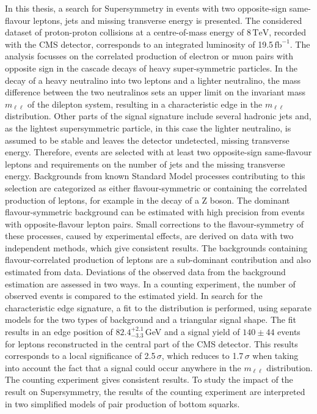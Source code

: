 In this thesis, a search for Supersymmetry in events with two opposite-sign same-flavour leptons, jets and missing transverse energy is presented. The considered dataset of proton-proton collisions at a centre-of-mass energy of 8$\,\mathrm{TeV}$, recorded with the CMS detector, corresponds to an integrated luminosity of 19.5\,$\mathrm{fb}^{-1}$. The analysis focusses on the correlated production of electron or muon pairs with opposite sign in the cascade decays of heavy super-symmetric particles. In the decay of a heavy neutralino into two leptons and a lighter neutralino, the mass difference between the two neutralinos sets an upper limit on the invariant mass $m_{\ell\ell}$ of the dilepton system, resulting in a characteristic edge in the $m_{\ell\ell}$ distribution. Other parts of the signal signature include several hadronic jets and, as the lightest supersymmetric particle, in this case the lighter neutralino, is assumed to be stable and leaves the detector undetected, missing transverse energy. Therefore, events are selected with at least two opposite-sign same-flavour leptons and requirements on the number of jets and the missing transverse energy. Backgrounds from known Standard Model processes contributing to this selection are categorized as either flavour-symmetric or containing the correlated production of leptons, for example in the decay of a $\mathrm{Z}$ boson. The dominant flavour-symmetric background can be estimated with high precision from events with opposite-flavour lepton pairs. Small corrections to the flavour-symmetry of these processes, caused by experimental effects, are derived on data with two independent methods, which give consistent results. The backgrounds containing flavour-correlated production of leptons are a sub-dominant contribution and also estimated from data. Deviations of the observed data from the background estimation are assessed in two ways. In a counting experiment, the number of observed events is compared to the estimated yield. In search for the characteristic edge signature, a fit to the \mll distribution is performed, using separate models for the two types of background and a triangular signal shape. The fit results in an edge position of $82.4^{+2.1}_{-3.3}$\,GeV and a signal yield of $140\pm44$ events for leptons reconstructed in the central part of the CMS detector. This results corresponds to a local significance of 2.5\,$\sigma$, which reduces to 1.7$\,\sigma$ when taking into account the fact that a signal could occur anywhere in the $m_{\ell\ell}$ distribution. The counting experiment gives consistent results. To study the impact of the result on Supersymmetry, the results of the counting experiment are interpreted in two simplified models of pair production of bottom squarks.   
